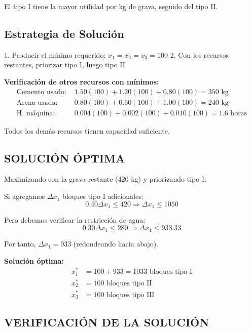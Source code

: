 \documentclass[12pt, a4paper, oneside]{book}
\theoremstyle{definition}
\begin{document}
El tipo I tiene la mayor utilidad por kg de grava, seguido del tipo II.

\subsection{Estrategia de Solución}

1. Producir el mínimo requerido: $x_1 = x_2 = x_3 = 100$
2. Con los recursos restantes, priorizar tipo I, luego tipo II

\textbf{Verificación de otros recursos con mínimos:}
\begin{align}
\text{Cemento usado: } &1.50(100) + 1.20(100) + 0.80(100) = 350 \text{ kg} \\
\text{Arena usada: } &0.80(100) + 0.60(100) + 1.00(100) = 240 \text{ kg} \\
\text{H. máquina: } &0.004(100) + 0.002(100) + 0.010(100) = 1.6 \text{ horas}
\end{align}

Todos los demás recursos tienen capacidad suficiente.

\subsection{SOLUCIÓN ÓPTIMA}

Maximizando con la grava restante (420 kg) y priorizando tipo I:

Si agregamos $\Delta x_1$ bloques tipo I adicionales:
\begin{equation}
0.40 \Delta x_1 \leq 420 \Rightarrow \Delta x_1 \leq 1050
\end{equation}

Pero debemos verificar la restricción de agua:
\begin{equation}
0.30 \Delta x_1 \leq 280 \Rightarrow \Delta x_1 \leq 933.33
\end{equation}

Por tanto, $\Delta x_1 = 933$ (redondeando hacia abajo).

\textbf{Solución óptima:}
\begin{align}
x_1^* &= 100 + 933 = 1033 \text{ bloques tipo I} \\
x_2^* &= 100 \text{ bloques tipo II} \\
x_3^* &= 100 \text{ bloques tipo III}
\end{align}

\subsection{VERIFICACIÓN DE LA SOLUCIÓN}
\end{document}
